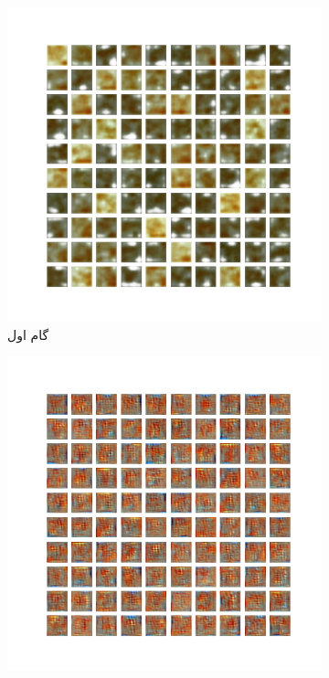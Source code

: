 \documentclass[12pt, a4paper]{book}
\begin{document}
\begin{figure}[h]
    \begin{subfigure}{0.3\linewidth}
        \includegraphics[width=\linewidth]{images/dcgan/nlayer3/generated_img_01.png}
        \caption{گام اول}
    \end{subfigure}
    \begin{subfigure}{0.3\linewidth}
        \includegraphics[width=\linewidth]{images/dcgan/nlayer3/generated_img_15.png}

\end{subfigure}
\end{figure}
\end{document}
